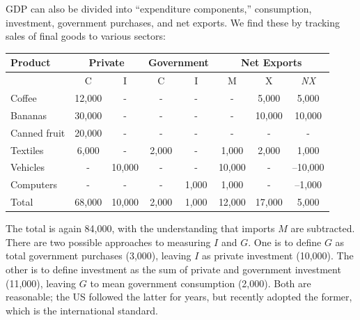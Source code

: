 \documentclass[letterpaper,12pt]{article}
\newcommand{\phm}{\phantom{--}}
\newcommand{\NX}{\mbox{\it NX\/}}
\begin{document}
\begin{enumerate}
GDP can also be divided into ``expenditure components,''
consumption, investment, government purchases, and net exports. We
find these by tracking sales of final goods to various sectors:
\begin{center}
\begin{tabular}{lccccccc}
\hline\hline
Product       & \multicolumn{2}{c}{Private}     & \multicolumn{2}{c}{Government}    & \multicolumn{3}{c}{Net Exports}     \\%
\hline%
              &       C              & I         & C                 & I               & M          & X      & \NX     \\%
\hline\hline%
Coffee        &     12,000           & -         & -                 &    -            & -          & 5,000  & 5,000    \\%
\cline{1-8}%
Bananas       &     30,000           & -         & -                 &    -            & -          & 10,000 & 10,000     \\%
\cline{1-8}%
Canned fruit  &     20,000           & -         & -                 &    -            & -          & -      & -     \\%
\cline{1-8}%
Textiles      &      6,000           & -         & 2,000             &    -            & 1,000      & 2,000  & 1,000      \\%
\cline{1-8}%
Vehicles      &        -             & 10,000    & -                 &    -            & 10,000     & -      & --10,000\phm      \\%
\cline{1-8}%
Computers     &        -             & -         & -                 &   1,000         & 1,000      & -      & --1,000      \\%
\hline\hline%
Total         &     68,000           & 10,000    & 2,000 &   1,000 &
12,000     & 17,000 & 5,000 \\
\hline\hline%
\end{tabular}
\end{center}
The total is again 84,000, with the understanding that imports $M$
are subtracted.  There are two possible approaches to measuring $I$
and $G$.  One is to define $G$ as total government purchases
(3,000), leaving $I$ as private investment (10,000).  The other is
to define investment as the sum of private and government investment
(11,000), leaving $G$ to mean government consumption (2,000). Both
are reasonable; the US followed the latter for years,  but recently
adopted the former, which is the international standard.


\end{enumerate}
\end{document}
